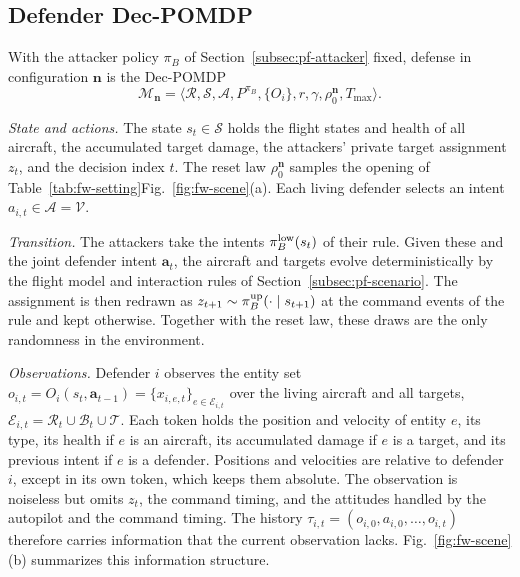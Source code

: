 \subsection{Defender Dec-POMDP}
\label{subsec:pf-decpomdp}

With the attacker policy $\pi_B$ of Section~\ref{subsec:pf-attacker} fixed, defense in configuration $\mathbf n$ is the Dec-POMDP~\cite{oliehoek2016decpomdp}
\begin{equation}
\mathcal M_{\mathbf n}=\big\langle\mathcal R,\mathcal S,\mathcal A,P^{\pi_B},\{O_i\},r,\gamma,\rho_0^{\mathbf n},T_{\max}\big\rangle.
\label{eq:fw-decpomdp}
\end{equation}

\emph{State and actions.} The state $s_t\in\mathcal S$ holds the flight states and health of all aircraft, the accumulated target damage, the attackers' private target assignment $z_t$, and the decision index $t$. The reset law $\rho_0^{\mathbf n}$ samples the opening of \ifvehicledetail Table~\ref{tab:fw-setting}\else Fig.~\ref{fig:fw-scene}(a)\fi. Each living defender selects an intent $a_{i,t}\in\mathcal A=\mathcal V$.

\emph{Transition.} The attackers take the intents $\pi_B^{\rm low}(s_t)$ of their rule. Given these and the joint defender intent $\mathbf a_t$, the aircraft and targets evolve deterministically by the flight model and interaction rules of Section~\ref{subsec:pf-scenario}. The assignment is then redrawn as $z_{t+1}\sim\pi_B^{\rm up}(\cdot\mid s_{t+1})$ at the command events of the rule and kept otherwise. Together with the reset law, these draws are the only randomness in the environment.

\emph{Observations.} Defender $i$ observes the entity set $o_{i,t}=O_i(s_t,\mathbf a_{t-1})=\{x_{i,e,t}\}_{e\in\mathcal E_{i,t}}$ over the living aircraft and all targets, $\mathcal E_{i,t}=\mathcal R_t\cup\mathcal B_t\cup\mathcal T$. Each token holds the position and velocity of entity $e$, its type, its health if $e$ is an aircraft, its accumulated damage if $e$ is a target, and its previous intent if $e$ is a defender. Positions and velocities are relative to defender $i$, except in its own token, which keeps them absolute. The observation is noiseless but omits $z_t$\ifvehicledetail, the command timing, and the attitudes handled by the autopilot\else{} and the command timing\fi. The history $\tau_{i,t}=(o_{i,0},a_{i,0},\dots,o_{i,t})$ therefore carries information that the current observation lacks. Fig.~\ref{fig:fw-scene}(b) summarizes this information structure.

